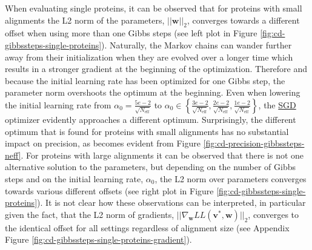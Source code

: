 \documentclass[11pt,a4paper,twoside]{book}
\renewcommand{\v}{\mathbf{v}}
\newcommand{\w}{\mathbf{w}}
\theoremstyle{definition}
\theoremstyle{definition}
\theoremstyle{remark}
\begin{document}
When evaluating single proteins, it can be observed that for proteins
with small alignments the L2 norm of the parameters, \(||\w||_2\),
converges towards a different offset when using more than one Gibbs
steps (see left plot in Figure \ref{fig:cd-gibbssteps-single-proteins}).
Naturally, the Markov chains can wander further away from their
initialization when they are evolved over a longer time which results in
a stronger gradient at the beginning of the optimization. Therefore and
because the initial learning rate has been optimized for one Gibbs step,
the parameter norm overshoots the optimum at the beginning. Even when
lowering the initial learning rate from
\(\alpha_0 = \frac{5e-2}{\sqrt{N_{\text{eff}}}}\) to
\(\alpha_0 \in \left \{ \frac{3e-2}{\sqrt{N_{\text{eff}}}}, \frac{2e-2}{\sqrt{N_{\text{eff}}}} , \frac{1e-2}{\sqrt{N_{\text{eff}}}} \right \}\),
the \protect\hyperlink{abbrev}{SGD} optimizer evidently approaches a
different optimum. Surprisingly, the different optimum that is found for
proteins with small alignments has no substantial impact on precision,
as becomes evident from Figure \ref{fig:cd-precision-gibbssteps-neff}.
For proteins with large alignments it can be observed that there is not
one alternative solution to the parameters, but depending on the number
of Gibbs steps and on the initial learning rate, \(\alpha_0\), the L2
norm over parameters converges towards various different offsets (see
right plot in Figure \ref{fig:cd-gibbssteps-single-proteins}). It is not
clear how these observations can be interpreted, in particular given the
fact, that the L2 norm of gradients,
\(||\nabla_{\w} L\!L(\v^*, \w)||_2\), converges to the identical offset
for all settings regardless of alignment size (see Appendix Figure
\ref{fig:cd-gibbssteps-single-proteins-gradient}).
\end{document}
